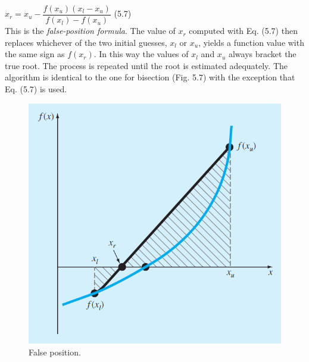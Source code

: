 \documentclass[../main.tex]{subfiles}
\begin{document}
$x_r = x_u - \dfrac{f(x_u)(x_l-x_u)}{f(x_l)-f(x_u)}$
\hfill (5.7)\\

This is the \emph{false-position formula}. The value of $x_r$ computed with Eq. (5.7) then replaces
whichever of the two initial guesses, $x_l$ or $x_u$, yields a function value with the same
sign as $f (x_r )$. In this way the values of $x_l$ and $x_u$ always bracket the true root. The process
is repeated until the root is estimated adequately. The algorithm is identical to the one for
bisection (Fig. 5.7) with the exception that Eq. (5.7) is used.\\
\newpage

\begin{figure}[h]
    \includegraphics[width=0.65\linewidth]{./images/fig_5_8}
    \caption{False position.}
\end{figure}
\end{document}

